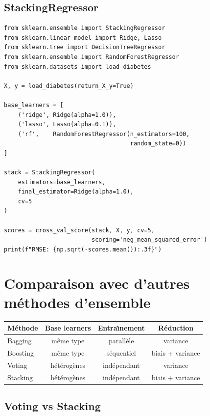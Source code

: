 \documentclass[a4paper,11pt]{article}
\theoremstyle{definition}
\theoremstyle{remark}
\begin{document}
\subsection{StackingRegressor}

\begin{lstlisting}
from sklearn.ensemble import StackingRegressor
from sklearn.linear_model import Ridge, Lasso
from sklearn.tree import DecisionTreeRegressor
from sklearn.ensemble import RandomForestRegressor
from sklearn.datasets import load_diabetes

X, y = load_diabetes(return_X_y=True)

base_learners = [
    ('ridge', Ridge(alpha=1.0)),
    ('lasso', Lasso(alpha=0.1)),
    ('rf',    RandomForestRegressor(n_estimators=100,
                                    random_state=0))
]

stack = StackingRegressor(
    estimators=base_learners,
    final_estimator=Ridge(alpha=1.0),
    cv=5
)

scores = cross_val_score(stack, X, y, cv=5,
                         scoring='neg_mean_squared_error')
print(f"RMSE: {np.sqrt(-scores.mean()):.3f}")
\end{lstlisting}

\section{Comparaison avec d'autres méthodes d'ensemble}

\begin{tabular}{lccc}
\toprule
M\'ethode & Base learners & Entra\^\i nement & R\'eduction \\
\midrule
Bagging    & m\^eme type & parall\`ele     & variance \\
Boosting   & m\^eme type & s\'equentiel    & biais + variance \\
Voting     & h\'et\'erog\`enes & ind\'ependant & variance \\
Stacking   & h\'et\'erog\`enes & ind\'ependant & biais + variance \\
\bottomrule
\end{tabular}

\subsection{Voting vs Stacking}
\end{document}
